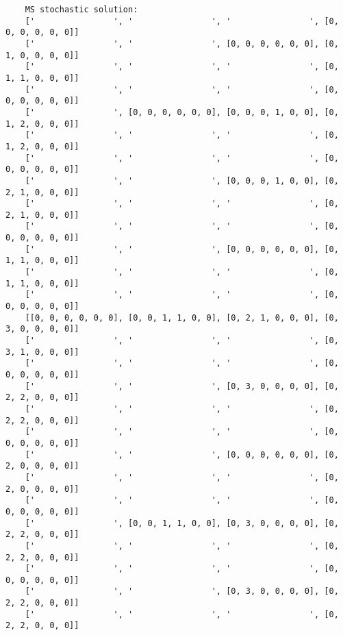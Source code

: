 \documentclass[10pt]{article}
\theoremstyle{plain}
\theoremstyle{definition}
\theoremstyle{remark}
\begin{document}
\begin{minipage}[t]{9cm}\tiny
	\begin{verbatim}
	MS stochastic solution:
	['                ', '                ', '                ', [0, 0, 0, 0, 0, 0]]
	['                ', '                ', [0, 0, 0, 0, 0, 0], [0, 1, 0, 0, 0, 0]]
	['                ', '                ', '                ', [0, 1, 1, 0, 0, 0]]
	['                ', '                ', '                ', [0, 0, 0, 0, 0, 0]]
	['                ', [0, 0, 0, 0, 0, 0], [0, 0, 0, 1, 0, 0], [0, 1, 2, 0, 0, 0]]
	['                ', '                ', '                ', [0, 1, 2, 0, 0, 0]]
	['                ', '                ', '                ', [0, 0, 0, 0, 0, 0]]
	['                ', '                ', [0, 0, 0, 1, 0, 0], [0, 2, 1, 0, 0, 0]]
	['                ', '                ', '                ', [0, 2, 1, 0, 0, 0]]
	['                ', '                ', '                ', [0, 0, 0, 0, 0, 0]]
	['                ', '                ', [0, 0, 0, 0, 0, 0], [0, 1, 1, 0, 0, 0]]
	['                ', '                ', '                ', [0, 1, 1, 0, 0, 0]]
	['                ', '                ', '                ', [0, 0, 0, 0, 0, 0]]
	[[0, 0, 0, 0, 0, 0], [0, 0, 1, 1, 0, 0], [0, 2, 1, 0, 0, 0], [0, 3, 0, 0, 0, 0]]
	['                ', '                ', '                ', [0, 3, 1, 0, 0, 0]]
	['                ', '                ', '                ', [0, 0, 0, 0, 0, 0]]
	['                ', '                ', [0, 3, 0, 0, 0, 0], [0, 2, 2, 0, 0, 0]]
	['                ', '                ', '                ', [0, 2, 2, 0, 0, 0]]
	['                ', '                ', '                ', [0, 0, 0, 0, 0, 0]]
	['                ', '                ', [0, 0, 0, 0, 0, 0], [0, 2, 0, 0, 0, 0]]
	['                ', '                ', '                ', [0, 2, 0, 0, 0, 0]]
	['                ', '                ', '                ', [0, 0, 0, 0, 0, 0]]
	['                ', [0, 0, 1, 1, 0, 0], [0, 3, 0, 0, 0, 0], [0, 2, 2, 0, 0, 0]]
	['                ', '                ', '                ', [0, 2, 2, 0, 0, 0]]
	['                ', '                ', '                ', [0, 0, 0, 0, 0, 0]]
	['                ', '                ', [0, 3, 0, 0, 0, 0], [0, 2, 2, 0, 0, 0]]
	['                ', '                ', '                ', [0, 2, 2, 0, 0, 0]]
	\end{verbatim}
\end{minipage}
\end{document}
